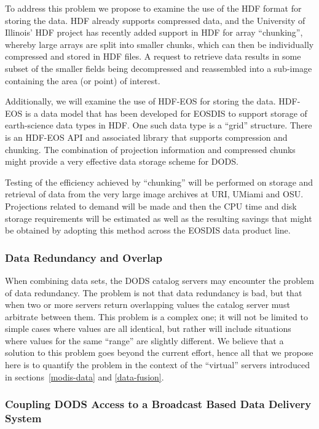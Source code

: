 \documentclass[12pt]{article}
\begin{document}
To address this problem we propose to examine the use of the \acs{HDF} 
format for storing the data.  \acs{HDF} already supports compressed 
data, and the University of Illinois' \acs{HDF} project has recently 
added support in \acs{HDF} for array ``chunking'', whereby large arrays 
are split into smaller chunks, which can then be individually 
compressed and stored in \acs{HDF} files.  A request to retrieve data 
results in some subset of the smaller fields being decompressed and 
reassembled into a sub-image containing the area (or point) of interest.

Additionally, we will examine the use of \acs{HDF-EOS} for storing the 
data.  \acs{HDF-EOS} is a data model that has been developed for 
\acs{EOSDIS} to support storage of earth-science data types in 
\acs{HDF}.  One such data type is a ``grid'' structure. There is an 
\acs{HDF-EOS} \acs{API} and associated library that supports compression 
and chunking.  The combination of projection information and compressed 
chunks might provide a very effective data storage scheme for \ac{DODS}.

Testing of the efficiency achieved by ``chunking'' will be performed
on storage and retrieval of data from the very large image archives 
at \ac{URI}, \ac{UMiami} and \ac{OSU}. Projections related to demand 
will be made and then the \acs{CPU} time and disk storage requirements
will be estimated as well as the resulting savings that might be
obtained by adopting this method across the \acs{EOSDIS} data
product line.

\subsubsection{Data Redundancy and Overlap}\label{redundancy}

When combining data sets, the \ac{DODS} catalog servers may encounter 
the problem of data redundancy. The problem is not that data redundancy 
is bad, but that when two or more servers return overlapping values 
the catalog server must arbitrate between them. This problem is a 
complex one; it will not be limited to simple cases where values are 
all identical, but rather will include situations where values for 
the same ``range'' are slightly different. We believe that a solution 
to this problem goes beyond the current effort, hence all that we
propose here is to quantify the problem in the context of the 
``virtual'' servers introduced in sections~\ref{modis-data} and
\ref{data-fusion}.

\subsubsection{Coupling \ac{DODS} Access to a Broadcast Based Data 
Delivery System}\label{push-pull}
\end{document}
